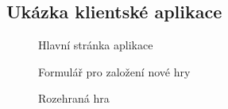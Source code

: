 \documentclass{article}
\begin{document}
\begin{appendices}
\newpage
\section{Ukázka klientské aplikace}
\begin{figure}[!h]
\begin{center}
    \caption{Hlavní stránka aplikace}
    \label{fig:overview}
\end{center}
\end{figure}

\begin{figure}[!h]
\begin{center}
    \caption{Formulář pro založení nové hry}
    \label{fig:new_game}
\end{center}
\end{figure}

\begin{figure}[!h]
\begin{center}
    \caption{Rozehraná hra}
    \label{fig:game}
\end{center}
\end{figure}


\end{appendices}
\end{document}
